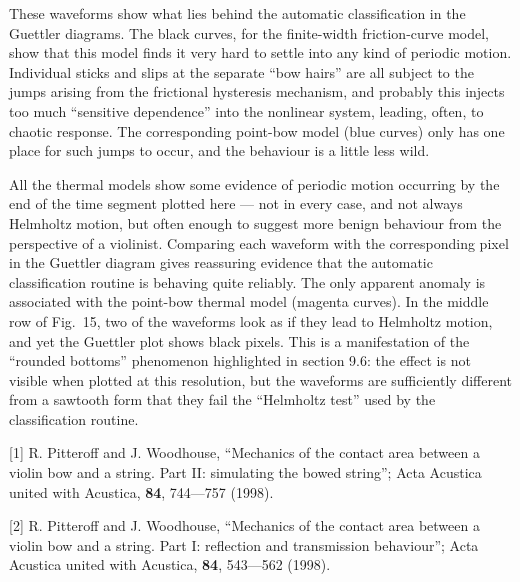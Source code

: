







  These waveforms show what lies behind the automatic classification in the 
  Guettler diagrams. The black curves, for the finite-width friction-curve 
  model, show that this model finds it very hard to settle into any kind of 
  periodic motion. Individual sticks and slips at the separate “bow hairs” are 
  all subject to the jumps arising from the frictional hysteresis mechanism, 
  and probably this injects too much “sensitive dependence” into the nonlinear 
  system, leading, often, to chaotic response. The corresponding point-bow 
  model (blue curves) only has one place for such jumps to occur, and the 
  behaviour is a little less wild. 

  All the thermal models show some evidence of periodic motion occurring by the 
  end of the time segment plotted here — not in every case, and not always 
  Helmholtz motion, but often enough to suggest more benign behaviour from the 
  perspective of a violinist. Comparing each waveform with the corresponding 
  pixel in the Guettler diagram gives reassuring evidence that the automatic 
  classification routine is behaving quite reliably. The only apparent anomaly 
  is associated with the point-bow thermal model (magenta curves). In the 
  middle row of Fig.\ 15, two of the waveforms look as if they lead to 
  Helmholtz motion, and yet the Guettler plot shows black pixels. This is a 
  manifestation of the “rounded bottoms” phenomenon highlighted in section 9.6: 
  the effect is not visible when plotted at this resolution, but the waveforms 
  are sufficiently different from a sawtooth form that they fail the “Helmholtz 
  test” used by the classification routine. 

  \sectionreferences{}[1] R. Pitteroff and J. Woodhouse, “Mechanics of the 
  contact area between a violin bow and a string. Part II: simulating the bowed 
  string”; Acta Acustica united with Acustica, \textbf{84}, 744—757 (1998). 

  [2] R. Pitteroff and J. Woodhouse, “Mechanics of the contact area between a 
  violin bow and a string. Part I: reflection and transmission behaviour”; Acta 
  Acustica united with Acustica, \textbf{84}, 543—562 (1998). 

